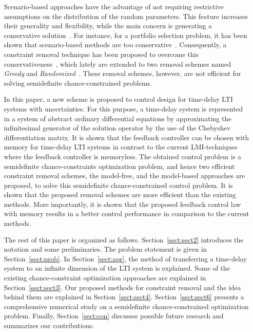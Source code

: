 \documentclass[journal]{IEEEtran}
\begin{document}
Scenario-based approaches have the advantage of not requiring restrictive assumptions on the distribution of the random parameters. This feature increases their generality and flexibility, while the main concern is generating a conservative solution~\cite{Pagnoncelli2012risk,Embrechts2005quantitative}. For instance, for a portfolio selection problem, it has been shown that scenario-based methods are too conservative~\cite{Pagnoncelli2008computational}. Consequently, a constraint removal technique has been proposed to overcome this conservativeness~\cite{Campi2011sampling}, which lately are extended to two removal schemes named \textit{Greedy} and \textit{Randomized}~\cite{Pagnoncelli2012risk}. These removal schemes, however, are not efficient for solving semidefinite chance-constrained problems.


In this paper, a new scheme is proposed to control design for time-delay LTI systems with uncertainties. For this purpose, a time-delay system is represented in a system of abstract ordinary differential equations by approximating the infinitesimal generator of the solution operator by the use of the Chebyshev differentiation matrix. It is shown that the feedback controller can be chosen with memory for time-delay LTI systems in contrast to the current LMI-techniques where the feedback controller is memoryless. The obtained control problem is a semidefinite chance-constraints optimization problem, and hence two efficient constraint removal schemes, the model-free, and the model-based approaches are proposed, to solve this semidefinite chance-constrained control problem. It is shown that the proposed removal schemes are more efficient than the existing methods. More importantly, it is shown that the proposed feedback control law with memory results in a better control performance in comparison to the current methods.

The rest of this paper is organized as follows. Section~\ref{sect:sect2} introduces the notation and some preliminaries. The problem statement is given in Section~\ref{sect:prob}. In Section~\ref{sect:apr}, the method of transferring a time-delay system to an infinite dimension of the LTI system is explained.
Some of the existing chance-constraint optimization approaches are explained in Section~\ref{sect:sect3}. Our proposed methods for constraint removal and the idea behind them are explained in Section~\ref{sect:sect4}. Section~\ref{sect:sect6} presents a comprehensive numerical study on a semidefinite chance-constrained optimization problem. Finally, Section~\ref{sect:con} discusses possible future research and summarizes our contributions.
\end{document}
